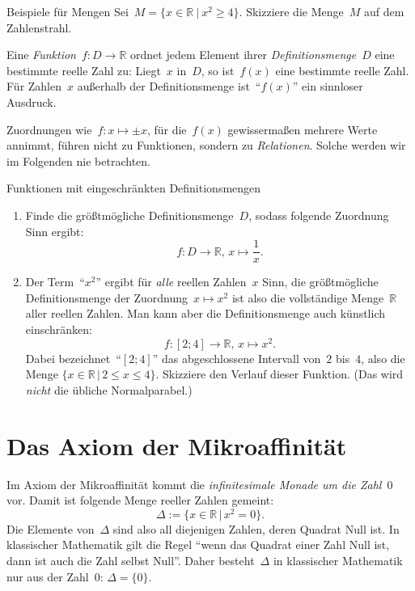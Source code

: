 \documentclass[twoside]{../zirkelblatt}
\newcommand{\RR}{\mathbb{R}}
\theoremstyle{definition}
\theoremstyle{plain}
\theoremstyle{remark}
\begin{document}
\begin{aufgabeShaded}{Beispiele für Mengen}
Sei~$M = \{ x \in \RR \ |\ x^2 \geq 4 \}$. Skizziere die Menge~$M$ auf dem
Zahlenstrahl.
\end{aufgabeShaded}

Eine \emph{Funktion}~$f : D \to \RR$ ordnet jedem Element ihrer
\emph{Definitionsmenge}~$D$ eine bestimmte reelle Zahl zu: Liegt~$x$ in~$D$, so
ist~$f(x)$ eine bestimmte reelle Zahl. Für Zahlen~$x$ außerhalb der
Definitionsmenge ist~"`$f(x)$"' ein sinnloser Ausdruck.

Zuordnungen wie~$f : x \mapsto \pm x$, für die~$f(x)$ gewissermaßen
mehrere Werte annimmt, führen nicht zu Funktionen, sondern zu \emph{Relationen}.
Solche werden wir im Folgenden nie betrachten.

\begin{aufgabeShaded}{Funktionen mit eingeschränkten Definitionsmengen}
\begin{enumerate}
\item Finde die größtmögliche Definitionsmenge~$D$, sodass folgende Zuordnung
Sinn ergibt:
\[ f : D \to \RR,\,x \mapsto \frac{1}{x}. \]
\item Der Term~"`$x^2$"' ergibt für \emph{alle} reellen Zahlen~$x$ Sinn, die
größtmögliche Definitionsmenge der Zuordnung~$x \mapsto x^2$ ist also die
vollständige Menge~$\RR$ aller reellen Zahlen. Man kann aber die
Definitionsmenge auch künstlich einschränken:
\[ f : [2;4] \to \RR,\,x \mapsto x^2. \]
Dabei bezeichnet~"`$[2;4]$"' das abgeschlossene Intervall von~$2$ bis~$4$, also
die Menge $\{ x \in \RR \,|\, 2 \leq x \leq 4 \}$. Skizziere den Verlauf dieser
Funktion. (Das wird \emph{nicht} die übliche Normalparabel.)
\end{enumerate}
\end{aufgabeShaded}


\section{Das Axiom der Mikroaffinität}

Im Axiom der Mikroaffinität kommt die \emph{infinitesimale Monade um die
Zahl~$0$} vor. Damit ist folgende Menge reeller Zahlen gemeint:
\[ \Delta := \{ x \in \RR \,|\, x^2 = 0 \}. \]
Die Elemente von~$\Delta$ sind also all diejenigen Zahlen, deren Quadrat Null
ist. In klassischer Mathematik gilt die Regel "`wenn das Quadrat einer Zahl
Null ist, dann ist auch die Zahl selbst Null"'. Daher besteht~$\Delta$ in klassischer
Mathematik nur aus der Zahl~$0$: $\Delta = \{ 0 \}$.
\end{document}
